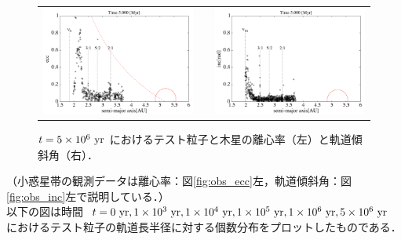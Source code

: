 \documentclass[11pt,a4paper,oneside,onecolumn]{jreport}
\begin{document}
\begin{figure}[H]
\begin{tabular}{ccc}
\begin{minipage}[t]{0.45\hsize}
\centering
\includegraphics[width=8cm]{./image/asteroid_ecc_5Myr.pdf}
\end{minipage} &
\begin{minipage}[t]{0.1\hsize}
\end{minipage} &
\begin{minipage}[t]{0.45\hsize}
\centering
\includegraphics[width=8cm]{./image/asteroid_inc_5Myr.pdf}
\end{minipage}\\
%
\end{tabular}
\caption{$t = 5 \times 10^6\ {\rm yr}$ におけるテスト粒子と木星の離心率（左）と軌道傾斜角（右）．\label{fig:asteroid_ecc_inc_5Myr}}
\end{figure}

（小惑星帯の観測データは離心率：図\ref{fig:obs_ecc}左，軌道傾斜角：図\ref{fig:obs_inc}左で説明している．）
\\



以下の図は時間 $t = 0\ {\rm yr}, 1 \times 10^3\ {\rm yr}, 1 \times 10^4\ {\rm yr}, 1 \times 10^5\ {\rm yr}, 1 \times 10^6\ {\rm yr}, 5 \times 10^6\ {\rm yr}$ におけるテスト粒子の軌道長半径に対する個数分布をプロットしたものである．
\end{document}
